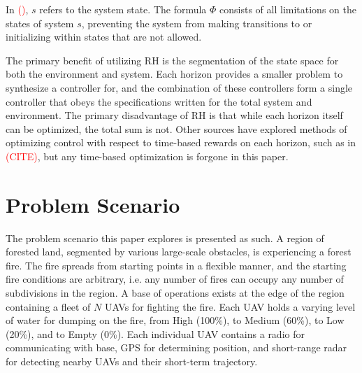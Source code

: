 \documentclass[journal]{IEEEtran}
\begin{document}
In \textcolor{red}{()}, $s$ refers to the system state. The formula $\Phi$ consists of all limitations on the states of system $s$, preventing the system from making transitions to or initializing within states that are not allowed.

The primary benefit of utilizing RH is the segmentation of the state space for both the environment and system. Each horizon provides a smaller problem to synthesize a controller for, and the combination of these controllers form a single controller that obeys the specifications written for the total system and environment. The primary disadvantage of RH is that while each horizon itself can be optimized, the total sum is not. Other sources have explored methods of optimizing control with respect to time-based rewards on each horizon, such as in \textcolor{red}{(CITE)}, but any time-based optimization is forgone in this paper. 

\section{Problem Scenario}
The problem scenario this paper explores is presented as such. A region of forested land, segmented by various large-scale obstacles, is experiencing a forest fire. The fire spreads from starting points in a flexible manner, and the starting fire conditions are arbitrary, i.e. any number of fires can occupy any number of subdivisions in the region. A base of operations exists at the edge of the region containing a fleet of $N$ UAVs for fighting the fire. Each UAV holds a varying level of water for dumping on the fire, from High (100\%), to Medium (60\%), to Low (20\%), and to Empty (0\%). Each individual UAV contains a radio for communicating with base, GPS for determining position, and short-range radar for detecting nearby UAVs and their short-term trajectory. 
\end{document}
